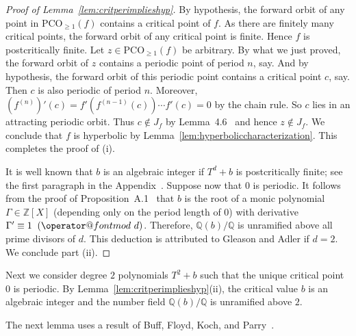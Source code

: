 \documentclass[12pt,oneside,a4]{amsart}
\makeatletter
\newcommand{\IQ}{\mathbb{Q}}
\newcommand{\IZ}{\mathbb{Z}}
\numberwithin{maincounter}{section}
\numberwithin{equation}{section}
\def\imod#1{\allowbreak\mkern10mu({\operator@font mod}\,\,#1)}
\newcommand{\pco}{\mathrm{PCO}}
\makeatother
\begin{document}
\begin{proof}[Proof of Lemma~\ref{lem:critperimplieshyp}]
  By hypothesis, the forward orbit of any point in $\pco_{\ge 1}(f)$
  contains a critical point of $f$.
  As there are finitely many critical points, the forward orbit of any
  critical point is
  finite. Hence  $f$ is postcritically finite.
  Let $z\in \pco_{\ge 1}(f)$ be arbitrary. By what we just proved, the
  forward orbit of $z$ contains a periodic point of period $n$, say.
  And by hypothesis,
  the forward orbit of this periodic point contains a critical point
  $c$, say. Then $c$ is also periodic of period $n$.
  Moreover,
  $(f^{(n)})'(c) = f'(f^{(n-1)}(c))\cdots f'(c)=0$ by the chain rule.
  So $c$ lies in an attracting periodic orbit. Thus
  $c\not\in J_f$ by Lemma~4.6~\cite{Milnor} and  hence $z\not\in
  J_f$.
  We conclude that $f$
  is hyperbolic by Lemma~\ref{lem:hyperboliccharacterization}. This
  completes the proof of (i).

  It is well known that $b$ is an algebraic integer if $T^d+b$
  is postcritically finite; see the first paragraph in the 
  Appendix~\cite{epstein:12}.
  Suppose now that $0$ is periodic. 
  It follows from the proof of 
  Proposition~A.1~\cite{epstein:12} that
  $b$ is the root of a monic polynomial $\Gamma \in \IZ[X]$ (depending only
  on the period length of $0$)
  with derivative $\Gamma' \equiv 1 \imod d$.
  Therefore, 
  $\IQ(b)/\IQ$ is unramified above all prime divisors of $d$.
  This deduction is  attributed to Gleason and Adler if $d=2$.
  We
  conclude part (ii).  
\end{proof}

Next we consider  degree $2$ polynomials $T^2+b$ such that the unique
critical point $0$ is periodic. 
By Lemma~\ref{lem:critperimplieshyp}(ii),
the critical value $b$ is an algebraic integer 
and the number field $\IQ(b)/\IQ$ is
unramified above $2$. 

The next lemma uses a result of Buff, Floyd, Koch, and
Parry~\cite{BFKP:Gleason}.
\end{document}
